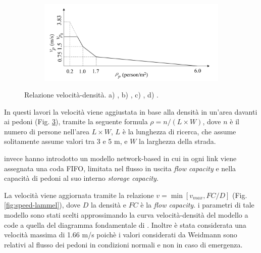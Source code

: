 \begin{figure}[ht]
\begin{subfigure}{0.45\textwidth}
        \caption{}
        \label{fig:speed-goto}
    \end{subfigure}
    \hfill
    \begin{subfigure}{0.45\textwidth}
        \includegraphics[width=\textwidth]{images/speed_WANG.png}
        \caption{}
        \label{fig:speed-wang}
    \end{subfigure}
    \caption{Relazione velocità-densità.
        a) \textcite[]{lammel2010emergency},
        b) \textcite[]{takabatake2017simulated},
        c) \textcite[]{goto2012tsunami},
        d) \textcite[]{wang2021novel}.
    }
    \label{fig:speeds}
\end{figure}

In questi lavori la velocità viene aggiustata in base alla densità in un'area davanti ai pedoni (Fig. \ref{fig:speeds}), tramite la seguente formula
$\rho = n /(L \times W)$, dove $n$ è il numero di persone nell'area $L \times W$, $L$ è la lunghezza di ricerca, che assume solitamente assume valori tra 3 e 5 m, e $W$ la larghezza della strada.

\textcite{lammel2010emergency} invece hanno introdotto un modello network-based in cui in ogni link viene assegnata una coda FIFO,
limitata nel flusso in uscita \textit{flow capacity} e nella capacità di pedoni al suo interno \textit{storage capacity}.

La velocità viene aggiornata tramite la relazione $v = \min[v_{max}, FC / D]$ (Fig. \ref{fig:speed-lammel}),
dove $D$ la densità e $FC$ è la \textit{flow capacity}.
i parametri di tale modello sono stati scelti approssimando la curva velocità-densità del modello a code a quella
del diagramma fondamentale di \textcite{weidmann1993transporttechnik}.
Inoltre è stata considerata una velocità massima di 1.66 m/s poichè i valori considerati da Weidmann sono relativi
al flusso dei pedoni in condizioni normali e non in caso di emergenza.


